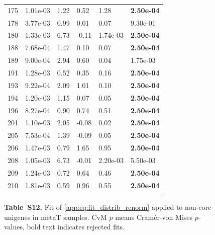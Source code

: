 \begin{figure}[htbp!]
{\begin{minipage}[t]{0.48\linewidth}
\begin{tabular}{llllll}
                    175 & 1.01e-03 & 1.22 & 0.52 & 1.28 & \textbf{2.50e-04}\\
                    178 & 3.77e-03 & 0.99 & 0.01 & 0.07 & 9.30e-01\\
                    180 & 1.33e-03 & 6.73 & -0.11 & 1.74e-03 & \textbf{2.50e-04}\\
                    188 & 7.68e-04 & 1.47 & 0.10 & 0.07 & \textbf{2.50e-04}\\
                    189 & 9.00e-04 & 2.94 & 0.60 & 0.04 & 1.75e-03\\
                    191 & 1.28e-03 & 0.52 & 0.35 & 0.16 & \textbf{2.50e-04}\\
                    193 & 9.22e-04 & 2.09 & 1.01 & 0.10 & \textbf{2.50e-04}\\
                    194 & 1.20e-03 & 1.15 & 0.07 & 0.05 & \textbf{2.50e-04}\\
                    196 & 8.27e-04 & 0.90 & 0.74 & 0.51 & \textbf{2.50e-04}\\
                    201 & 1.10e-03 & 2.05 & -0.08 & 0.02 & \textbf{2.50e-04}\\
                    205 & 7.53e-04 & 1.39 & -0.09 & 0.05 & \textbf{2.50e-04}\\
                    206 & 1.47e-03 & 0.79 & 1.65 & 0.95 & \textbf{2.50e-04}\\
                    208 & 1.05e-03 & 6.73 & -0.01 & 2.20e-03 & 5.50e-03\\
                    209 & 1.24e-03 & 0.72 & 0.64 & 0.46 & \textbf{2.50e-04}\\
                    210 & 1.81e-03 & 0.59 & 0.96 & 0.55 & \textbf{2.50e-04}\\
                     &  &  &  &  & \\
        \bottomrule
        \end{tabular}
    \end{minipage}
    }
    \caption*{\textbf{Table~S12.} Fit of \eqref{app:eq:fit_distrib_renorm} applied to non-core unigenes in metaT samples. CvM $p$ means Cram\'er-von Mises $p$-values, bold text indicates rejected fits.}
    \label{subtab:app:core:metaT:non_core}
\end{figure}